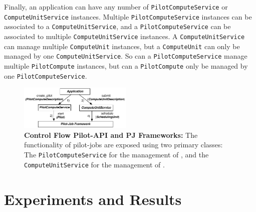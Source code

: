 \documentclass[conference]{IEEEtran}
\begin{document}
Finally, an application can have any number of \texttt{Pilot\-Compute\-Service} or
\texttt{Compute\-Unit\-Service} instances.
Multiple \texttt{Pilot\-Compute\-Service} instances can be associated to a
\texttt{Compute\-Unit\-Service}, and a \texttt{Pilot\-Compute\-Service} can be associated to
multiple \texttt{Compute\-Unit\-Service} instances.
A \texttt{Compute\-Unit\-Service} can manage multiple \texttt{Compute\-Unit}
instances, but a \texttt{Compute\-Unit} can only be managed by one
\texttt{Compute\-Unit\-Service}.
So can a \texttt{Pilot\-Compute\-Service} manage multiple
\texttt{Pilot\-Compute} instances, but can a \texttt{Pilot\-Compute} only be
managed by one \texttt{Pilot\-Compute\-Service}.


\begin{figure}[t]
	\centering
  \upp
		\includegraphics[width=0.48\textwidth]{../figures/pilot-api-flow.pdf}
	\caption{\textbf{Control Flow Pilot-API and PJ Frameworks:} The 
	functionality of pilot-jobs are exposed using two primary classes: The 
	\texttt{Pilot\-Compute\-Service} for the management 
	of \pilots, and the \texttt{Compute\-Unit\-Service} for the management of 
	\cus. \upp
	}
	\label{fig:figures_pilot_api_flow}
\end{figure}



\section{Experiments and Results}
\label{sec:exp_res}
\end{document}

